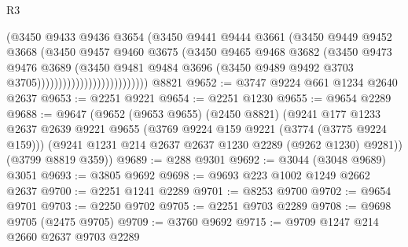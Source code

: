\begin{lexlean}{R3}
\begin{coremodule}
                                        (@3450
                                          @9433
                                          @9436
                                          @3654
                                          (@3450
                                            @9441
                                            @9444
                                            @3661
                                            (@3450
                                              @9449
                                              @9452
                                              @3668
                                              (@3450
                                                @9457
                                                @9460
                                                @3675
                                                (@3450
                                                  @9465
                                                  @9468
                                                  @3682
                                                  (@3450
                                                    @9473
                                                    @9476
                                                    @3689
                                                    (@3450
                                                      @9481
                                                      @9484
                                                      @3696
                                                      (@3450
                                                        @9489
                                                        @9492
                                                        @3703
                                                        @3705))))))))))))))))))))))))))
    @8821
@9652 := @3747 @9224 @661 @1234 @2640 @2637
@9653 := @2251 @9221
@9654 := @2251 @1230
@9655 := @9654 @2289
@9688 := @9647
    (@9652
      (@9653 @9655)
      (@2450 @8821)
      (@9241
        @177
        @1233
        @2637
        @2639
        @9221
        @9655
        (@3769 @9224 @159 @9221 (@3774 (@3775 @9224 @159)))
        (@9241 @1231 @214 @2637 @2637 @1230 @2289 (@9262 @1230) @9281))
      (@3799 @8819 @359))
@9689 := @288 @9301
@9692 := @3044 (@3048 @9689) @3051
@9693 := @3805 @9692
@9698 := @9693 @223 @1002 @1249 @2662 @2637
@9700 := @2251 @1241 @2289
@9701 := @8253 @9700
@9702 := @9654 @9701
@9703 := @2250 @9702
@9705 := @2251 @9703 @2289
@9708 := @9698 @9705 (@2475 @9705)
@9709 := @3760 @9692
@9715 := @9709 @1247 @214 @2660 @2637 @9703 @2289

\end{coremodule}
\end{lexlean}
